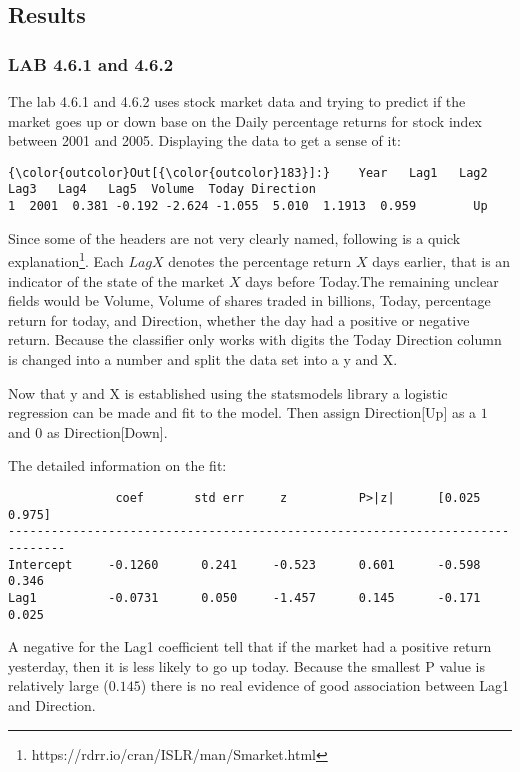 
\subsection{Results}
\subsubsection*{LAB 4.6.1 and 4.6.2}
The lab 4.6.1 and 4.6.2 uses stock market data and trying to predict if the market goes up or down base on the Daily percentage returns for stock index between 2001 and 2005.
Displaying the data to get a sense of it:
\begin{Verbatim}[commandchars=\\\{\}]
{\color{outcolor}Out[{\color{outcolor}183}]:}    Year   Lag1   Lag2   Lag3   Lag4   Lag5  Volume  Today Direction
1  2001  0.381 -0.192 -2.624 -1.055  5.010  1.1913  0.959        Up
\end{Verbatim}
Since some of the headers are not very clearly named, following is a quick explanation\footnote{https://rdrr.io/cran/ISLR/man/Smarket.html}. Each $LagX$ denotes the percentage return $X$ days earlier, that is an indicator of the state of the market $X$ days before Today.The remaining unclear fields would be Volume, Volume of shares traded in billions, Today, percentage return for today, and Direction, whether the day had a positive or negative return. Because the classifier only works with digits the Today Direction column is changed into a number and split the data set into a y and X.

Now that y and X is established using the statsmodels library a logistic regression can be made and fit to the model. Then assign Direction[Up] as a $1$ and $0$ as Direction[Down].

The detailed information on the fit:
\begin{lstlisting}
               coef       std err     z          P>|z|      [0.025      0.975]
------------------------------------------------------------------------------
Intercept     -0.1260      0.241     -0.523      0.601      -0.598       0.346
Lag1          -0.0731      0.050     -1.457      0.145      -0.171       0.025
\end{lstlisting}
A negative for the Lag1 coefficient tell that if the market had a positive return yesterday, then it is less likely to go up today. Because the smallest P value is relatively large ($0.145$) there is no real evidence of good association between Lag1 and Direction.

